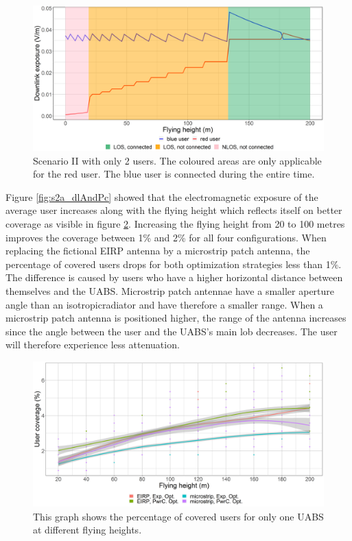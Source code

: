 \begin{figure}[h!]
  \includegraphics[width=\textwidth]{../results/s2/prove.png}
  \caption{Scenario II with only 2 users. The coloured areas are only applicable for the red user. 
  The blue user is connected during the entire time.}
  \label{fig:prove}
\end{figure}


Figure \ref{fig:s2a_dlAndPc} showed that the electromagnetic exposure of the average user increases along with the flying height
which reflects itself on better coverage as visible in figure  \ref{fig:s2fhvscov}.
Increasing the flying height from 20 to 100 metres improves the coverage between 1\% and 2\% for all four configurations.
When replacing the fictional \gls{EIRP} antenna by a microstrip patch antenna, the percentage of covered users drops for both 
optimization strategies less than 1\%. 
The difference is caused by users who have a higher horizontal distance between themselves and the \gls{UABS}. Microstrip 
patch antennae have a smaller aperture angle than an \gls{isotropicradiator} and have therefore a smaller range.
When a microstrip patch antenna is positioned higher, the range of the antenna increases 
since the angle between the user and the \gls{UABS}'s main lob decreases. The user will therefore experience less attenuation.

\begin{figure}[h!]
  \includegraphics[width=\textwidth]{../results/s2/fhvscov.png}
  \caption{This graph shows the percentage of covered users for only one \acs{UABS} at different flying heights.}
  \label{fig:s2fhvscov}
\end{figure}

